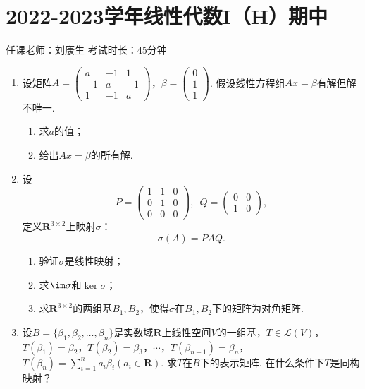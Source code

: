 \section{2022-2023学年线性代数I（H）期中}

\begin{center}
    任课老师：刘康生\hspace{4em} 考试时长：45分钟
\end{center}
\begin{enumerate}
    \item  设矩阵$A=\begin{pmatrix}
        a & -1 & 1 \\ -1 & a & -1 \\ 1 & -1 & a
    \end{pmatrix}$，$\beta=\begin{pmatrix}
        0 \\ 1 \\ 1
    \end{pmatrix}$. 假设线性方程组$Ax=\beta$有解但解不唯一.
    \begin{enumerate}
        \item 求$a$的值；

        \item 给出$Ax=\beta$的所有解.
    \end{enumerate}

    \item 设
    \[P=\begin{pmatrix}
        1 & 1 & 0 \\ 0 & 1 & 0 \\ 0 & 0 & 0
    \end{pmatrix},\enspace Q=\begin{pmatrix}
        0 & 0 \\ 1 & 0
    \end{pmatrix},\]
    定义$\mathbf{R}^{3\times 2}$上映射$\sigma$：
    \[\sigma(A)=PAQ.\]
    \begin{enumerate}
        \item 验证$\sigma$是线性映射；

        \item 求$\im\sigma$和$\ker\sigma$；

        \item 求$\mathbf{R}^{3\times 2}$的两组基$B_1,B_2$，使得$\sigma$在$B_1,B_2$下的矩阵为对角矩阵.
    \end{enumerate}

    \item 设$B=\{\beta_1,\beta_2,\ldots,\beta_n\}$是实数域$\mathbf{R}$上线性空间$V$的一组基，$T\in\mathcal{L}(V)$，$T(\beta_1)=\beta_2$，$T(\beta_2)=\beta_3$，$\cdots$，$T(\beta_{n-1})=\beta_n$，$T(\beta_n)=\sum\limits_{i=1}^{n}a_i\beta_i(a_i\in\mathbf{R})$. 求$T$在$B$下的表示矩阵. 在什么条件下$T$是同构映射？


\end{enumerate}
